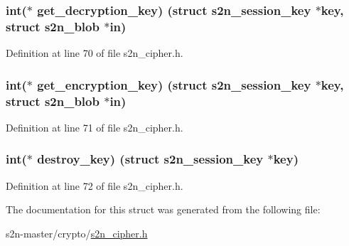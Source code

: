 \subsubsection[{\texorpdfstring{get\+\_\+decryption\+\_\+key}{get_decryption_key}}]{\setlength{\rightskip}{0pt plus 5cm}int($\ast$ get\+\_\+decryption\+\_\+key) (struct {\bf s2n\+\_\+session\+\_\+key} $\ast$key, struct {\bf s2n\+\_\+blob} $\ast$in)}\hypertarget{structs2n__cipher_ad1e19d6d38d153a7a35e69c00cf101c1}{}\label{structs2n__cipher_ad1e19d6d38d153a7a35e69c00cf101c1}


Definition at line 70 of file s2n\+\_\+cipher.\+h.

\subsubsection[{\texorpdfstring{get\+\_\+encryption\+\_\+key}{get_encryption_key}}]{\setlength{\rightskip}{0pt plus 5cm}int($\ast$ get\+\_\+encryption\+\_\+key) (struct {\bf s2n\+\_\+session\+\_\+key} $\ast$key, struct {\bf s2n\+\_\+blob} $\ast$in)}\hypertarget{structs2n__cipher_a4ceb5624c688f6180fd838ac799bde36}{}\label{structs2n__cipher_a4ceb5624c688f6180fd838ac799bde36}


Definition at line 71 of file s2n\+\_\+cipher.\+h.

\subsubsection[{\texorpdfstring{destroy\+\_\+key}{destroy_key}}]{\setlength{\rightskip}{0pt plus 5cm}int($\ast$ destroy\+\_\+key) (struct {\bf s2n\+\_\+session\+\_\+key} $\ast$key)}\hypertarget{structs2n__cipher_aefd41942eaf98d2033c2a778adac0149}{}\label{structs2n__cipher_aefd41942eaf98d2033c2a778adac0149}


Definition at line 72 of file s2n\+\_\+cipher.\+h.



The documentation for this struct was generated from the following file\+:\begin{DoxyCompactItemize}
\item 
s2n-\/master/crypto/\hyperlink{s2n__cipher_8h}{s2n\+\_\+cipher.\+h}\end{DoxyCompactItemize}

